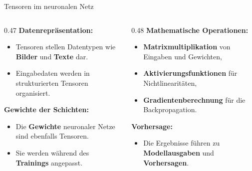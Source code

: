 \begin{frame}{Tensoren im neuronalen Netz}
\begin{columns}
\begin{column}{0.47\textwidth}
\textbf{Datenrepräsentation:}
\begin{itemize}
\item Tensoren stellen Datentypen wie \textbf{Bilder} und \textbf{Texte} dar.
\item Eingabedaten werden in strukturierten Tensoren organisiert.
\end{itemize}

\vspace{0.4em}
\textbf{Gewichte der Schichten:}
\begin{itemize}
\item Die \textbf{Gewichte} neuronaler Netze sind ebenfalls Tensoren.
\item Sie werden während des \textbf{Trainings} angepasst.
\end{itemize}
\end{column}
\begin{column}{0.48\textwidth}
\textbf{Mathematische Operationen:}
\begin{itemize}
\item \textbf{Matrixmultiplikation} von Eingaben und Gewichten,
\item \textbf{Aktivierungsfunktionen} für Nichtlinearitäten,
\item \textbf{Gradientenberechnung} für die Backpropagation.
\end{itemize}

\vspace{0.4em}
\textbf{Vorhersage:}
\begin{itemize}
\item Die Ergebnisse führen zu \textbf{Modellausgaben} und \textbf{Vorhersagen}.
\end{itemize}
\end{column}
\end{columns}
\end{frame}

